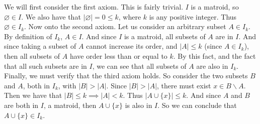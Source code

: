 \documentclass{article}
\begin{document}
\begin{description}
        We will first consider the first axiom. This is fairly trivial. $I$ is a
        matroid, so $\varnothing \in I$. We also have that $|\varnothing| = 0 \leq
        k$, where $k$ is any positive integer. Thus $\varnothing \in I_k$. Now
        onto the second axiom. Let us consider an arbitrary subset $A \in
        I_k$. By definition of $I_k$, $A \in I$. And since $I$ is a matroid,
        all subsets of $A$ are in $I$. And since taking a subset of $A$
        cannot increase its order, and $|A| \leq k$ (since $A \in I_k$), then
        all subsets of $A$ have order less than or equal to $k$. By this fact,
        and the fact that all such subsets are in $I$, we can see that all
        subsets of $A$ are also in $I_k$. Finally, we must verify that the
        third axiom holds. So consider the two subsets $B$ and $A$, both in
        $I_k$, with
        $|B| > |A|$. Since $|B| > |A|$,  there must exist $x \in B \backslash A$.
        Then we have that $|B| \leq k \implies |A| < k$. Thus $|A \cup \{x\}|
        \leq k$. And since $A$ and $B$ are both in $I$, a matroid, then $A \cup \{x\}$
        is also in $I$. So we can conclude that $A \cup \{x\} \in I_k$.

\end{description}
\newpage

\end{document}
